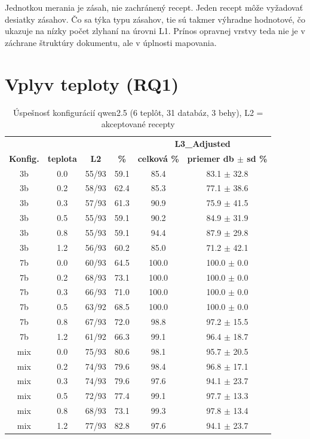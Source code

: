 Jednotkou merania je zásah, nie zachránený recept. Jeden recept môže vyžadovať desiatky zásahov. Čo sa týka typu zásahov, tie sú takmer výhradne hodnotové, čo ukazuje na nízky počet zlyhaní na úrovni L1. Prínos opravnej vrstvy teda nie je v záchrane štruktúry dokumentu, ale v úplnosti mapovania.

\section{Vplyv teploty (RQ1)}

\begin{table}[H]
    \centering
    \small
    \begin{tabular}{cccccc}
    \toprule
    & & & & \multicolumn{2}{c}{\textbf{L3\_Adjusted}} \\
    \textbf{Konfig.} & \textbf{teplota} & \textbf{L2} & \textbf{\%} & \textbf{celková \%} & \textbf{priemer db $\pm$ sd \%} \\
    \midrule
        3b & 0.0 & 55/93 & 59.1 & 85.4 & 83.1 $\pm$ 32.8 \\ 
        3b & 0.2 & 58/93 & 62.4 &  85.3 & 77.1 $\pm$ 38.6 \\ 
        3b & 0.3 & 57/93 & 61.3 &  90.9 & 75.9 $\pm$ 41.5 \\ 
        3b & 0.5 & 55/93 & 59.1 &  90.2 & 84.9 $\pm$ 31.9 \\ 
        3b & 0.8 & 55/93 & 59.1 & 94.4 & 87.9 $\pm$ 29.8 \\
        3b & 1.2 & 56/93 & 60.2 & 85.0 & 71.2 $\pm$ 42.1 \\
        \midrule
        7b & 0.0 & 60/93 & 64.5 &  100.0 & 100.0 $\pm$ 0.0 \\ 
        7b & 0.2 & 68/93 & 73.1 & 100.0 & 100.0 $\pm$ 0.0 \\ 
        7b & 0.3 & 66/93 & 71.0 &  100.0 & 100.0 $\pm$ 0.0 \\ 
        7b & 0.5 & 63/92 & 68.5 &  100.0 & 100.0 $\pm$ 0.0 \\ 
        7b & 0.8 & 67/93 & 72.0 &  98.8 & 97.2 $\pm$ 15.5 \\ 
        7b & 1.2 & 61/92 & 66.3 &  99.1 & 96.4 $\pm$ 18.7 \\ 
        \midrule
        mix & 0.0 & 75/93 & 80.6 &  98.1 & 95.7 $\pm$ 20.5 \\ 
        mix & 0.2 & 74/93 & 79.6 &  98.4 & 96.8 $\pm$ 17.1 \\
        mix & 0.3 & 74/93 & 79.6 &  97.6 & 94.1 $\pm$ 23.7 \\ 
        mix & 0.5 & 72/93 & 77.4 &  99.1 & 97.7 $\pm$ 13.3 \\ 
        mix & 0.8 & 68/93 & 73.1 &  99.3 & 97.8 $\pm$ 13.4 \\ 
        mix & 1.2 & 77/93 & 82.8 &  97.6 & 94.1 $\pm$ 23.7 \\ 
    \bottomrule
    \end{tabular}
    \caption{Úspešnosť konfigurácií qwen2.5 (6 teplôt, 31 databáz, 3 behy), L2 = akceptované recepty}
    \label{tab:vysledky_jadro}
\end{table}



